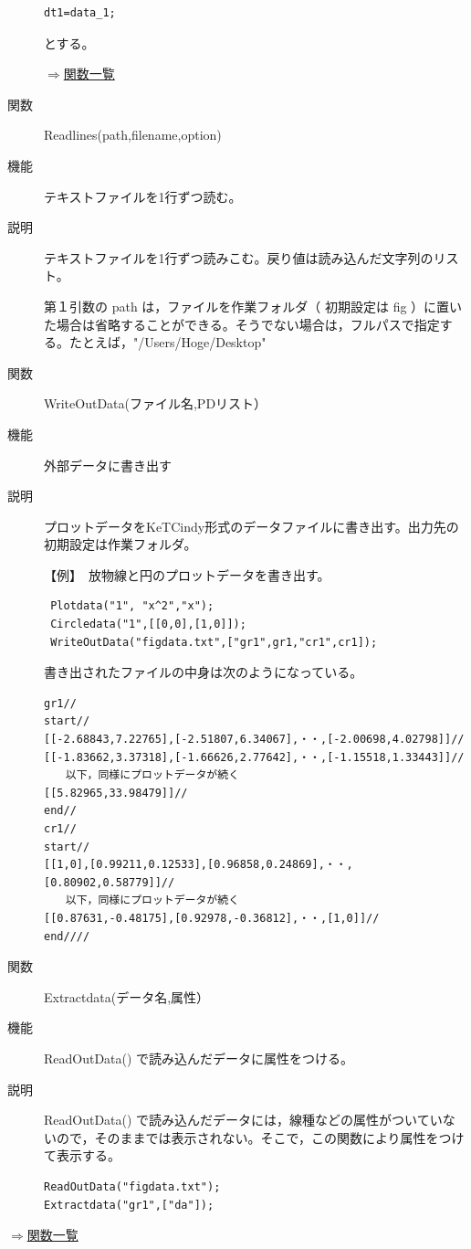 \documentclass[papersize,a4paper,12pt,uplatex]{jsarticle}
\begin{document}
\begin{description}
\begin{verbatim}
dt1=data_1;
\end{verbatim}

とする。

\begin{flushright}\hyperlink{functionlist}{$\Rightarrow$関数一覧}\end{flushright}

\hypertarget{readlines}{}
\item[関数]Readlines(path,filename,option)
\item[機能]テキストファイルを1行ずつ読む。
\item[説明]テキストファイルを1行ずつ読みこむ。戻り値は読み込んだ文字列のリスト。

第１引数の path は，ファイルを作業フォルダ（ 初期設定は fig ）に置いた場合は省略することができる。そうでない場合は，フルパスで指定する。たとえば，"/Users/Hoge/Desktop"

\vspace{\baselineskip}
\hypertarget{writeoutdata}{}
\item[関数]WriteOutData(ファイル名,PDリスト）
\item[機能]外部データに書き出す
\item[説明]プロットデータをKeTCindy形式のデータファイルに書き出す。出力先の 初期設定は作業フォルダ。

【例】　放物線と円のプロットデータを書き出す。

\begin{verbatim}
 Plotdata("1", "x^2","x");
 Circledata("1",[[0,0],[1,0]]);
 WriteOutData("figdata.txt",["gr1",gr1,"cr1",cr1]);
\end{verbatim}

書き出されたファイルの中身は次のようになっている。

\begin{verbatim}
gr1// 
start//
[[-2.68843,7.22765],[-2.51807,6.34067],・・,[-2.00698,4.02798]]//
[[-1.83662,3.37318],[-1.66626,2.77642],・・,[-1.15518,1.33443]]//
　　以下，同様にプロットデータが続く
[[5.82965,33.98479]]//
end//
cr1//
start//
[[1,0],[0.99211,0.12533],[0.96858,0.24869],・・,[0.80902,0.58779]]//
　　以下，同様にプロットデータが続く
[[0.87631,-0.48175],[0.92978,-0.36812],・・,[1,0]]//
end////
\end{verbatim}

\vspace{\baselineskip}
\hypertarget{extractdata}{}
\item[関数]Extractdata(データ名,属性）
\item[機能]ReadOutData() で読み込んだデータに属性をつける。
\item[説明]ReadOutData() で読み込んだデータには，線種などの属性がついていないので，そのままでは表示されない。そこで，この関数により属性をつけて表示する。
\begin{verbatim}
ReadOutData("figdata.txt");
Extractdata("gr1",["da"]);
\end{verbatim}

\end{description}
\begin{flushright}\hyperlink{functionlist}{$\Rightarrow$関数一覧}\end{flushright}
\end{document}
